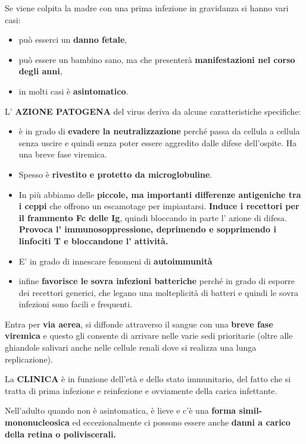   Se viene colpita la madre con una prima infezione in gravidanza si
  hanno vari casi:
\begin{itemize}

\item
  può esserci un \textbf{danno fetale},
\item
  può essere un bambino sano, ma che presenterà \textbf{manifestazioni
  nel corso degli anni},
\item
  in molti casi è \textbf{asintomatico}.
\end{itemize}
  L' \textbf{AZIONE PATOGENA} del virus deriva da alcune caratteristiche
  specifiche:
  \begin{itemize}
  
\item
  è in grado di \textbf{evadere la neutralizzazione} perché passa da
  cellula a cellula senza uscire e quindi senza poter essere aggredito
  dalle difese dell'ospite. Ha una breve fase viremica.
\item
  Spesso è \textbf{rivestito e protetto da microglobuline}.
\item
  In più abbiamo delle \textbf{piccole, ma importanti differenze
  antigeniche tra i ceppi} che offrono un escamotage per impiantarsi.
  \textbf{Induce i recettori per il frammento Fc delle Ig}, quindi
  bloccando in parte l' azione di difesa. \textbf{Provoca l'
  immunosoppressione, deprimendo e sopprimendo i linfociti T e
  bloccandone l' attività. }
\item
  E' in grado di innescare fenomeni di \textbf{autoimmunità }
\item
  infine \textbf{favorisce le sovra infezioni batteriche} perché in
  grado di esporre dei recettori generici, che legano una molteplicità
  di batteri e quindi le sovra infezioni sono facili e frequenti.
\end{itemize}
  Entra per \textbf{via aerea}, si diffonde attraverso il sangue con una
  \textbf{breve fase viremica} e questo gli consente di arrivare nelle
  varie sedi prioritarie (oltre alle ghiandole salivari anche nelle
  cellule renali dove si realizza una lunga replicazione).

  La \textbf{CLINICA} è in funzione dell'età e dello stato immunitario,
  del fatto che si tratta di prima infezione e reinfezione e ovviamente
  della carica infettante.

  Nell'adulto quando non è asintomatica, è lieve e c'è una \textbf{forma
  simil-mononucleosica} ed eccezionalmente ci possono essere anche
  \textbf{danni a carico della retina o poliviscerali.}

